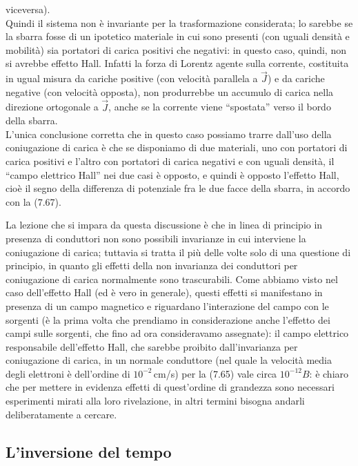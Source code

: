 viceversa).\\
Quindi il sistema non \`e invariante per la trasformazione considerata; lo
sarebbe se la sbarra fosse di un ipotetico materiale in cui sono presenti (con
uguali densit\`a e mobilit\`a) sia portatori di carica positivi che negativi: in
questo caso, quindi, non si avrebbe effetto Hall. Infatti la forza di Lorentz
agente sulla corrente, costituita in ugual misura da cariche positive (con
velocit\`a parallela a $\vec J$) e da cariche negative (con velocit\`a opposta),
non produrrebbe un accumulo di carica nella direzione ortogonale a $\vec J$,
anche se la corrente viene ``spostata'' verso il bordo della sbarra.\\
L'unica conclusione corretta che in questo caso possiamo trarre dall'uso della
coniugazione di carica \`e che se disponiamo di due materiali, uno con portatori
di carica positivi e l'altro con portatori di carica negativi e con uguali
densit\`a, il ``campo elettrico Hall'' nei due casi \`e opposto, e quindi \`e
opposto l'effetto Hall, cio\`e il segno della differenza di potenziale fra le
due facce della sbarra, in accordo con la (7.67).

La lezione che si impara da questa discussione \`e che in linea di principio in
presenza di conduttori non sono possibili invarianze in cui interviene la
coniugazione di carica; tuttavia si tratta il pi\`u delle volte solo di una
questione di principio, in quanto gli effetti della non invarianza dei
conduttori per coniugazione di carica normalmente sono trascurabili. Come
abbiamo visto nel caso dell'effetto Hall (ed \`e vero in generale), questi
effetti si manifestano in presenza di un campo magnetico e riguardano
l'interazione del campo con le sorgenti (\`e la prima volta che prendiamo in
considerazione anche l'effetto dei campi sulle sorgenti, che fino ad ora
consideravamo assegnate): il campo elettrico responsabile dell'effetto Hall, che
sarebbe proibito dall'invarianza per coniugazione di carica, in un normale
conduttore (nel quale la velocit\`a media degli elettroni \`e dell'ordine di
$10^{-2}$\,cm/s) per la (7.65) vale circa $10^{-12}B$: \`e chiaro che per
mettere in evidenza effetti di quest'ordine di grandezza sono necessari
esperimenti mirati alla loro rivelazione, in altri termini bisogna andarli
deliberatamente a cercare.

\subsection{L'inversione del tempo}

